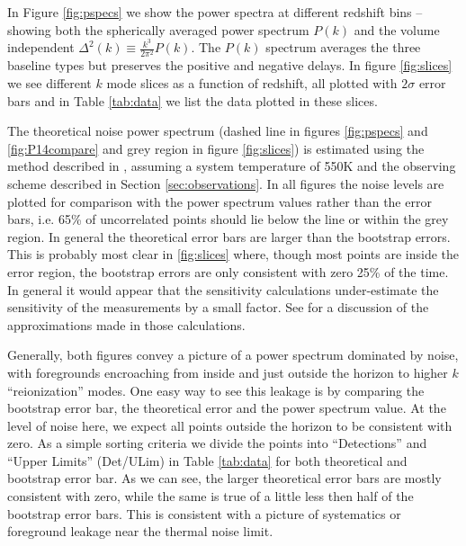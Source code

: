 \documentclass[preprint]{aastex}
\begin{document}
In  Figure \ref{fig:pspecs} we show the  power spectra at different redshift bins --showing both the spherically averaged power spectrum $P(k)$ and the volume independent  $\Delta^2(k)\equiv\frac{k^3}{2\pi^2}P(k)$.  The $P(k)$ spectrum averages the three baseline types but preserves the positive and negative delays.  In figure \ref{fig:slices} we see different $k$ mode slices as a function of redshift,  all plotted with $2\sigma$ error bars and in Table \ref{tab:data} we list the data plotted in these slices.   

The theoretical noise power spectrum (dashed line in figures \ref{fig:pspecs} and \ref{fig:P14compare} and grey region in figure \ref{fig:slices}) is estimated using the method described in \cite{Pober:2013p9581}, assuming a system temperature of 550K and the observing scheme described in Section \ref{sec:observations}. In all figures the noise levels are plotted for comparison with the power spectrum values rather than the error bars, i.e. 65\% of uncorrelated points should lie below the line or within the grey region.    In general the theoretical error bars are larger than the bootstrap errors.  This is probably most clear in \ref{fig:slices} where, though most points are inside the error region, the bootstrap errors are only consistent with zero 25\% of the time. In general it would appear that the sensitivity calculations under-estimate the sensitivity of the measurements by a small factor. See \cite{Pober:2014p10390,Pober:2013p9581} for a discussion of the approximations made in those calculations. 



Generally, both figures convey a picture of a power spectrum dominated by noise, with foregrounds encroaching from inside and just outside the horizon to higher $k$ ``reionization'' modes.  One easy way to see this leakage is by comparing the bootstrap error bar, the theoretical error and the power spectrum value.  At the level of noise here, we expect all points outside the horizon to be consistent with zero. As a simple sorting criteria we divide the points into ``Detections'' and ``Upper Limits'' (Det/ULim) in Table \ref{tab:data} for both theoretical and bootstrap error bar.  As we can see, the larger theoretical error bars are mostly consistent with zero, while the same is true of a little less then half of the bootstrap error bars.  This is consistent with a picture of systematics or foreground leakage near the thermal noise limit.
\end{document}
